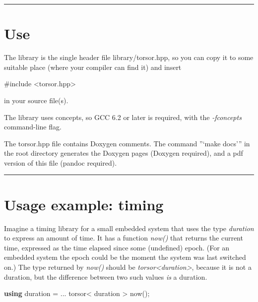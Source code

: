 \documentclass[]{article}
\newenvironment{Shaded}{}{}
\newcommand{\ImportTok}[1]{#1}
\newcommand{\KeywordTok}[1]{\textcolor[rgb]{0.00,0.44,0.13}{\textbf{#1}}}
\newcommand{\NormalTok}[1]{#1}
\newcommand{\PreprocessorTok}[1]{\textcolor[rgb]{0.74,0.48,0.00}{#1}}
\begin{document}
\begin{center}\rule{0.5\linewidth}{\linethickness}\end{center}

\hypertarget{use}{%
\section{Use}\label{use}}

The library is the single header file library/torsor.hpp, so you can
copy it to some suitable place (where your compiler can find it) and
insert

\begin{Shaded}
\begin{Highlighting}[]
\PreprocessorTok{#include }\ImportTok{<torsor.hpp>}
\end{Highlighting}
\end{Shaded}

in your source file(s).

The library uses concepts, so GCC 6.2 or later is required, with the
\emph{-fconcepts} command-line flag.

The torsor.hpp file contains Doxygen comments. The command ''`make
docs''' in the root directory generates the Doxygen pages (Doxygen
required), and a pdf version of this file (pandoc required).

\begin{center}\rule{0.5\linewidth}{\linethickness}\end{center}

\hypertarget{usage-example-timing}{%
\section{Usage example: timing}\label{usage-example-timing}}

Imagine a timing library for a small embedded system that uses the type
\emph{duration} to express an amount of time. It has a function
\emph{now()} that returns the current time, expressed as the time
elapsed since some (undefined) epoch. (For an embedded system the epoch
could be the moment the system was last switched on.) The type returned
by \emph{now()} should be
\emph{torsor\textless{}duration\textgreater{}}, because it is not a
duration, but the difference between two such values \emph{is} a
duration.

\begin{Shaded}
\begin{Highlighting}[]
\KeywordTok{using}\NormalTok{ duration = ...}
\NormalTok{torsor< duration > now();}
\end{Highlighting}
\end{Shaded}
\end{document}
